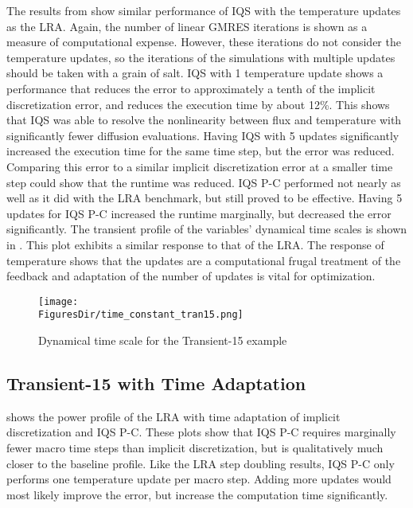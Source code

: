 The results from  show similar performance of IQS with the temperature updates as the LRA. Again, the number of linear GMRES iterations is shown as a measure of computational expense. However, these iterations do not consider the temperature updates, so the iterations of the simulations with multiple updates should be taken with a grain of salt. IQS with 1 temperature update shows a performance that reduces the error to approximately a tenth of the implicit discretization error, and reduces the execution time by about 12\%.  This shows that IQS was able to resolve the nonlinearity between flux and temperature with significantly fewer diffusion evaluations.  Having IQS with 5 updates significantly increased the execution time for the same time step, but the error was reduced.  Comparing this error to a similar implicit discretization error at a smaller time step could show that the runtime was reduced. IQS P-C performed not nearly as well as it did with the LRA benchmark, but still proved to be effective.  Having 5 updates for IQS P-C increased the runtime marginally, but decreased the error significantly.  The transient profile of the variables' dynamical time scales is shown in .  This plot exhibits a similar response to that of the LRA. The response of temperature shows that the updates are a computational frugal treatment of the feedback and adaptation of the number of updates is vital for optimization. \\

\begin{figure}[htbp!]
\centering
\texttt{[image: \\FiguresDir/time\_constant\_tran15.png]}
\caption{Dynamical time scale for the Transient-15 example}
\label{fig:tran15tc}
\end{figure}

\subsection{Transient-15 with Time Adaptation}

 shows the power profile of the LRA with time adaptation of implicit discretization and IQS P-C.  These plots show that IQS P-C requires marginally fewer macro time steps than implicit discretization, but is qualitatively much closer to the baseline profile. Like the LRA step doubling results, IQS P-C only performs one temperature update per macro step. Adding more updates would most likely improve the error, but increase the computation time significantly. 

